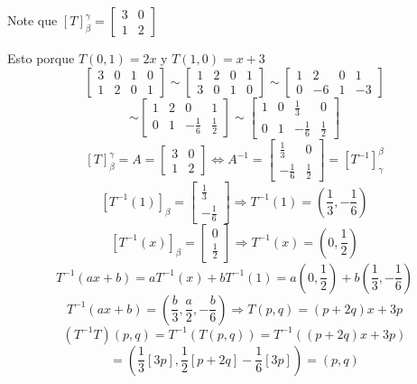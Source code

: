 \begin{proofexplanation}
    
Note que ${[T]}_{\beta}^{\gamma} = \begin{bmatrix}
    3 & 0 \\
    1 & 2
    \end{bmatrix}$

    Esto porque $T(0,1) = 2x$ y $T(1,0) = x + 3$
    $$\left[ \begin{array}{cc|cc}
     3 & 0 & 1 & 0  \\
    1 & 2 & 0 & 1 
\end{array} \right] \sim \left[ \begin{array}{cc|cc}
    1 & 2 & 0 & 1  \\
    3 & 0 & 1 & 0 
\end{array} \right] \sim  \left[  \begin{array}{cc|cc}
    1 & 2 & 0 & 1  \\
    0 & -6 & 1 & -3 
\end{array}\right]$$
    $$ \sim \left[ \begin{array}{cc|cc}
    1 & 2 & 0 & 1  \\
    0 & 1 & - \frac{1}{6} & \frac{1}{2}
\end{array}\right]  \sim \left[  \begin{array}{cc|cc}
    1 & 0 & \frac{1}{3} & 0 \\
    0 & 1 & - \frac{1}{6} & \frac{1}{2}
\end{array} \right] $$
    $$ {[T]}_{\beta}^{\gamma} = A =  \begin{bmatrix}
    3 & 0   \\
    1 & 2 
    \end{bmatrix} \iff {A}^{-1} = \begin{bmatrix}
    \frac{1}{3} &  0 \\
    - \frac{1}{6} & \frac{1}{2}
    \end{bmatrix} = {\left[{T}^{-1} \right]}_{\gamma}^{\beta} $$
    $${\left[{T}^{-1} (1) \right]}_{\beta} = \begin{bmatrix}
    \frac{1}{3} \\
    - \frac{1}{6} 
    \end{bmatrix} \Rightarrow T^{-1} (1) = \left( \frac{1}{3}, - \frac{1}{6}\right)$$
    $${\left[{T}^{-1} (x) \right]}_{\beta} = \begin{bmatrix}
    0 \\
     \frac{1}{2} 
    \end{bmatrix} \Rightarrow T^{-1} (x) = \left( 0,  \frac{1}{2}\right)$$
    $${T}^{-1}(ax+b) = a {T}^{-1} (x) + b {T}^{-1} (1) = a  \left( 0,  \frac{1}{2}\right) + b \left( \frac{1}{3}, - \frac{1}{6}\right)$$
    $${T}^{-1}(ax+b) = \left( \frac{b}{3} , \frac{a}{2}, - \frac{b}{6} \right) \Rightarrow T(p,q) = (p + 2q)x + 3p$$
    $$({T}^{-1} T ) (p,q) = {T}^{-1} (T(p,q)) = {T}^{-1} ((p + 2q)x + 3p)$$
    $$ = \left( \frac{1}{3} [3p], \frac{1}{2}[p+2q]-\frac{1}{6}[3p] \right) = (p,q)$$
\end{proofexplanation}


